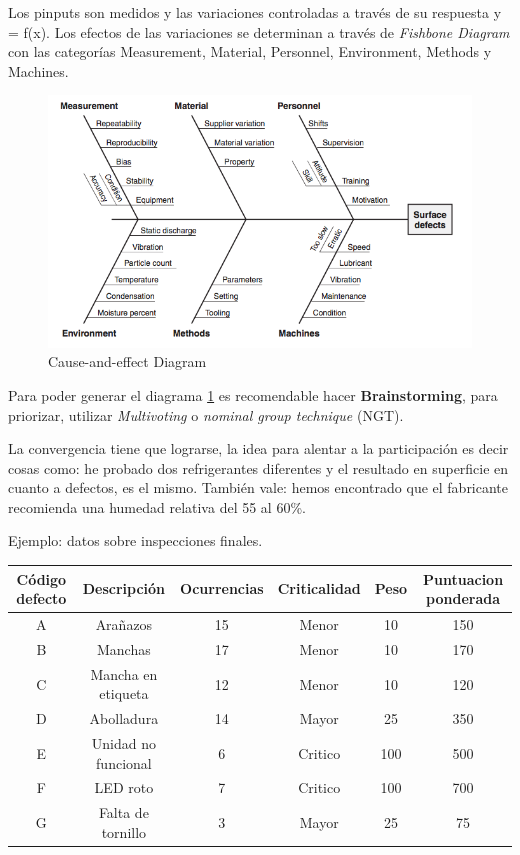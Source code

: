 \documentclass[]{article}
\begin{document}
Los pinputs son medidos y las variaciones controladas a través de su respuesta y = f(x). Los efectos de las variaciones se determinan a través de \textit{Fishbone Diagram} con las categorías Measurement, Material, Personnel, Environment, Methods y Machines.

\begin{figure}[ht!]
	\centering
	\includegraphics[width=120mm]{imagenes/Cause-and-effectDiagram.png}
	\caption{Cause-and-effect Diagram}
	\label{fig:CauseandeffectDiagram}
\end{figure}

Para poder generar el diagrama \ref{fig:CauseandeffectDiagram} es recomendable hacer \textbf{Brainstorming}, para priorizar, utilizar \textit{Multivoting} o \textit{nominal group technique} (NGT).

La convergencia tiene que lograrse, la idea para alentar a la participación es decir cosas como: he probado dos refrigerantes diferentes y el resultado en superficie en cuanto a defectos, es el mismo. También vale: hemos encontrado que el fabricante recomienda una humedad relativa del 55 al 60\%.

Ejemplo: datos sobre inspecciones finales.

\begin{tabular}{|c|c|c|c|c|c|}
	\hline Código defecto & Descripción & Ocurrencias & Criticalidad & Peso & Puntuacion ponderada \\ 
	\hline A & Arañazos & 15 & Menor & 10 & 150 \\ 
	\hline B & Manchas & 17 & Menor & 10 & 170 \\ 
	\hline C & Mancha en etiqueta & 12 & Menor & 10 & 120 \\ 
	\hline D & Abolladura & 14 & Mayor & 25 & 350 \\ 
	\hline E & Unidad no funcional & 6 & Critico & 100 & 500 \\ 
	\hline F & LED roto & 7 & Critico & 100 & 700\\ 
	\hline G & Falta de tornillo & 3 & Mayor & 25 & 75 \\ 
	\hline 
\end{tabular} 
\end{document}
